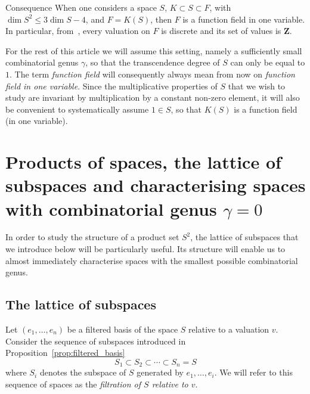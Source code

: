 \documentclass[10pt]{amsart}
\theoremstyle{definition}
\theoremstyle{remark}
\newenvironment{enonce*}[2][]{\par\medskip\noindent\textbf{#2.}\ }{\par\medskip}
\newcommand*\Z{{\mathbf Z}}
\renewcommand{\leq}{\leqslant}
\begin{document}
\begin{enonce*}[remark]{Consequence}
When one considers a space $S$, $K\subset S \subset F$, with $\dim S^2\leq3\dim S - 4$, and $F= K(S)$, then $F$ is a function field in one variable. In particular, from~\cite[Theorem~1.1.16]{Stichtenoth}, every valuation on $F$ is discrete and its set of values is $\Z$.
\end{enonce*}

For the rest of this article we will assume this setting, namely a sufficiently small combinatorial genus $\gamma$, so that the transcendence degree of $S$ can only be equal to $1$. The term \emph{function field} will consequently always mean from now on \emph{function field in one variable}. Since the multiplicative properties of $S$ that we wish to study are invariant by multiplication by a constant non-zero element, it will also be convenient to systematically assume $1\in S$, so that $K(S)$ is a function field (in one variable).


\section{Products of spaces, the lattice of subspaces and characterising spaces with combinatorial genus \texorpdfstring{$\gamma=0$}{gamma=0}}\label{sec:products}

In order to study the structure of a product set $S^2$, the lattice of subspaces that we introduce below will be particularly useful. Its structure will enable us to almost immediately characterise spaces with the smallest possible combinatorial genus.

\subsection{The lattice of subspaces}\label{sec:lattice}

Let $(e_1,\ldots,e_n)$ be a filtered basis of the space $S$ relative to a valuation $v$. Consider the sequence of subspaces {introduced in Proposition~\ref{prop:filtered_basis}}
\[
S_1\subset S_2\subset\cdots \subset S_n=S
\]
where $S_i$ denotes the subspace of $S$ generated by $e_1,\ldots ,e_i$. We will refer to this sequence of spaces as the \emph{filtration of $S$ relative to $v$}.
\end{document}
